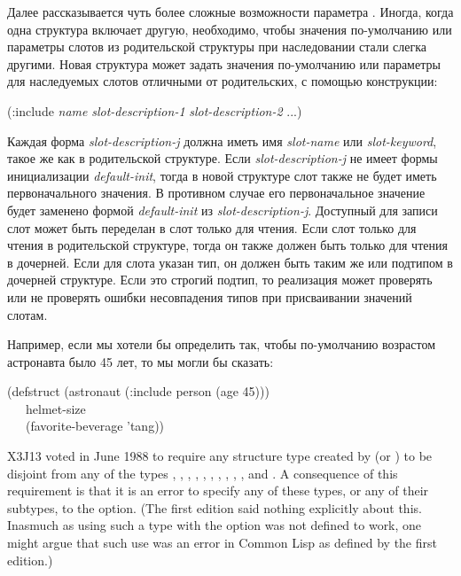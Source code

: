 \begin{flushdesc}
  Далее рассказывается чуть более сложные возможности параметра .
  Иногда, когда одна структура включает другую, необходимо, чтобы значения
  по-умолчанию или параметры слотов из родительской структуры при наследовании
  стали слегка другими.  Новая структура может задать значения по-умолчанию или
  параметры для наследуемых слотов отличными от родительских, с помощью
  конструкции:
  \begin{lisp}
    (:include \emph{name} \emph{slot-description-1} \emph{slot-description-2}
    ...)
  \end{lisp}
  Каждая форма \emph{slot-description-j} должна иметь имя \emph{slot-name} или
  \emph{slot-keyword}, такое же как в родительской структуре.  Если
  \emph{slot-description-j} не имеет формы инициализации \emph{default-init},
  тогда в новой структуре слот также не будет иметь первоначального значения. В
  противном случае его первоначальное значение будет заменено формой
  \emph{default-init} из \emph{slot-description-j}.  Доступный для записи слот
  может быть переделан в слот только для чтения.  Если слот только для чтения в
  родительской структуре, тогда он также должен быть только для чтения в
  дочерней.  Если для слота указан тип, он должен быть таким же или подтипом в
  дочерней структуре. Если это строгий подтип, то реализация может проверять или
  не проверять ошибки несовпадения типов при присваивании значений слотам.

  Например, если мы хотели бы определить  так, чтобы по-умолчанию
  возрастом астронавта было 45 лет, то мы могли бы сказать:
  \begin{lisp}
    (defstruct (astronaut (:include person (age 45))) \\
    ~~~helmet-size \\
    ~~~(favorite-beverage 'tang))
  \end{lisp}

  \begin{new}
    X3J13 voted in June 1988  to
    require any structure type created by  (or ) to
    be disjoint from any of the types , , ,
    , , , ,
    , , , and .  A
    consequence of this requirement is that it is an error to specify any of
    these types, or any of their subtypes, to the  
    option.  (The first edition said nothing explicitly about this.  Inasmuch as
    using such a type with the  option was not defined to work, one
    might argue that such use was an error in Common Lisp as defined by the
    first edition.)
  \end{new}


\end{flushdesc}
